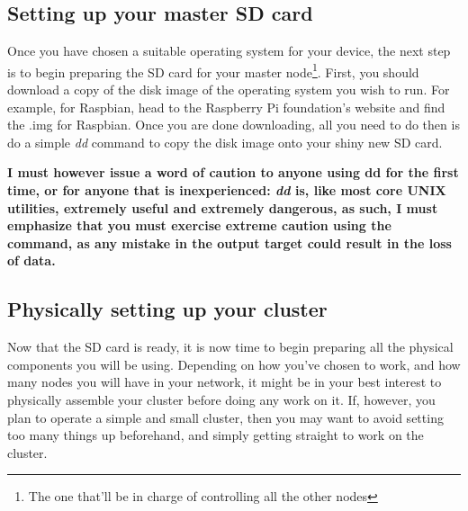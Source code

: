\documentclass[]{article}
\begin{document}
                                         \subsection{Setting up your master SD card}
                                         Once you have chosen a suitable operating system for your device, the next step is to begin preparing the SD 
                                         card for your master node\footnote{The one that'll be in charge of controlling all the other nodes}. First, 
                                         you should download a copy of the disk image of the operating system you wish to run. For example, for 
                                         Raspbian, head to the Raspberry Pi foundation's website and find the .img for Raspbian. Once you are done 
                                         downloading, all you need to do then is do a simple \textit{dd} command to copy the disk image onto your 
                                         shiny new SD card.

                                         \textbf{I must however issue a word of caution to anyone using dd for the first time, or for anyone that is 
                                             inexperienced: \textit{dd} is, like most core UNIX utilities, extremely useful and extremely dangerous, as 
                                                 such, I must emphasize that you must exercise extreme caution using the command, as any mistake in the 
                                                 output target could result in the loss of data.}

                                                 \subsection{Physically setting up your cluster}
                                                 Now that the SD card is ready, it is now time to begin preparing all the physical components you will be 
                                                 using. Depending on how you've chosen to work, and how many nodes you will have in your network, it might be 
                                                 in your best interest to physically assemble your cluster before doing any work on it. If, however, you plan 
                                                 to operate a simple and small cluster, then you may want to avoid setting too many things up beforehand, and 
                                                 simply getting straight to work on the cluster.
\end{document}
